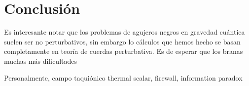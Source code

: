 \chapter{Conclusión}

Es interesante notar que los problemas de agujeros negros en gravedad cuántica suelen ser
no perturbativos, sin embargo lo cálculos que hemos hecho se basan completamente en teoría de 
cuerdas perturbativa.
Es de esperar que los branas muchas más dificultades

Personalmente, campo taquiónico thermal scalar, firewall, information paradox

